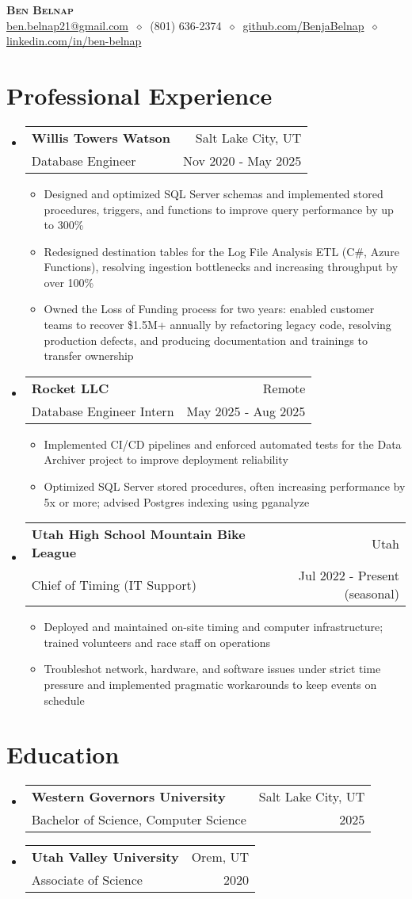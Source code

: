 \documentclass[letterpaper,11pt]{article}
\makeatletter
\newcommand{\cvitem}[1]{
  \item\small{
    {#1\vspace{-2pt}}
  }
}
\newcommand{\cvheading}[4]{
  \vspace{-2pt}\item
    \begin{tabular*}{\textwidth}[t]{l@{\extracolsep{\fill}}r}
      \textbf{#1} & #2 \\
      \small#3 & \small #4 \\
    \end{tabular*}\vspace{-7pt}
}
\newcommand{\cvheadingstart}{\begin{itemize}[leftmargin=0in, label={}]}
\newcommand{\cvheadingend}{\end{itemize}}
\newcommand{\cvitemstart}{\begin{itemize}[label=\textopenbullet]\justifying}
\newcommand{\cvitemend}{\end{itemize}\vspace{-5pt}}
\makeatother
\begin{document}
\begin{center}
  \textbf{\LARGE\scshape Ben Belnap} \\
  \vspace{1pt}\small
  \href{mailto:ben.belnap21@gmail.com}{ben.belnap21@gmail.com}
  $\ \diamond\ $ 
  (801) 636-2374
  $\ \diamond\ $
  \href{https://github.com/BenjaBelnap}{github.com/BenjaBelnap}
  $\ \diamond\ $
  \href{https://www.linkedin.com/in/ben-belnap}{linkedin.com/in/ben-belnap}
\end{center}

\section{Professional Experience}
\cvheadingstart
  \cvheading
    {Willis Towers Watson}{Salt Lake City, UT}
    {Database Engineer}{Nov 2020 - May 2025}
  \cvitemstart
  \cvitem{Designed and optimized SQL Server schemas and implemented stored procedures, triggers, and functions to improve query performance by up to 300\%}
  \cvitem{Redesigned destination tables for the Log File Analysis ETL (C\#, Azure Functions), resolving ingestion bottlenecks and increasing throughput by over 100\%}
  \cvitem{Owned the Loss of Funding process for two years: enabled customer teams to recover \$1.5M+ annually by refactoring legacy code, resolving production defects, and producing documentation and trainings to transfer ownership}
  \cvitemend

  \cvheading
    {Rocket LLC}{Remote}
    {Database Engineer Intern}{May 2025 - Aug 2025}
  \cvitemstart
  \cvitem{Implemented CI/CD pipelines and enforced automated tests for the Data Archiver project to improve deployment reliability}
  \cvitem{Optimized SQL Server stored procedures, often increasing performance by 5x or more; advised Postgres indexing using pganalyze}
  \cvitemend

  \cvheading
    {Utah High School Mountain Bike League}{Utah}
    {Chief of Timing (IT Support)}{Jul 2022 - Present (seasonal)}
  \cvitemstart
  \cvitem{Deployed and maintained on-site timing and computer infrastructure; trained volunteers and race staff on operations}
  \cvitem{Troubleshot network, hardware, and software issues under strict time pressure and implemented pragmatic workarounds to keep events on schedule}
  \cvitemend
\cvheadingend

\section{Education}
\cvheadingstart
  \cvheading
    {Western Governors University}{Salt Lake City, UT}
    {Bachelor of Science, Computer Science}{2025}
  \cvheading
    {Utah Valley University}{Orem, UT}
    {Associate of Science}{2020}
\cvheadingend
\end{document}
